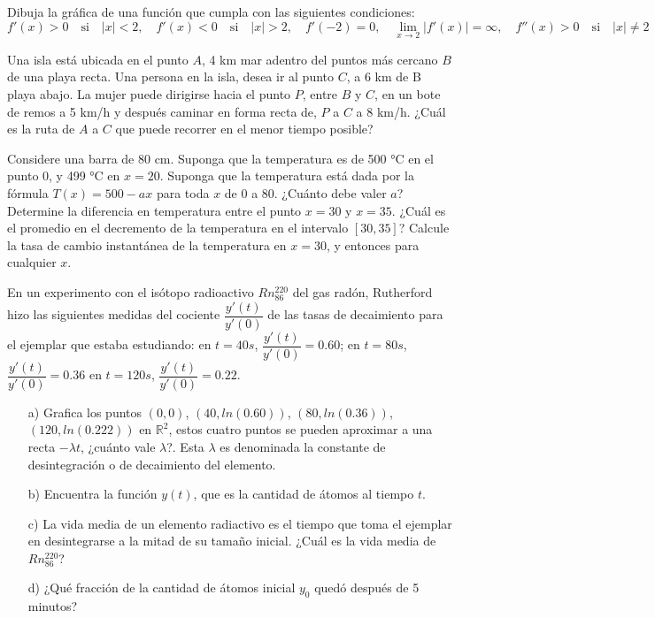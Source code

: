 \documentclass[10pt]{exam}
\begin{document}
\begin{questions}
\question Dibuja la gráfica de una función que cumpla con las siguientes condiciones:
$$f'(x)>0 \quad \text{si}\quad |x|<2, \quad f'(x)<0 \quad \text{si}\quad |x|>2, \quad f'(-2)=0, \quad \lim\limits_{x \to 2}|f'(x)|=\infty, \quad f''(x)>0 \quad \text{si}\quad |x|\neq 2$$

\question Una isla está ubicada en el punto $A$, 4 km mar adentro del puntos más cercano $B$ de una playa recta. Una persona en la isla, desea ir al punto $C$, a 6 km de B playa abajo. La mujer puede dirigirse hacia el punto $P$, entre $B$ y $C$, en un bote de remos a 5 km/h y después caminar en forma recta de, $P$ a $C$ a 8 km/h. ¿Cuál es la ruta de $A$ a $C$ que puede recorrer en el menor tiempo posible?

\question Considere una barra de 80 cm. Suponga que la temperatura es de 500 °C en el punto 0, y 499 °C en $x = 20$. Suponga que la temperatura está dada por la fórmula $T(x) = 500-ax$ para toda $x$ de 0 a 80. ¿Cuánto debe valer $a$? Determine la diferencia en temperatura entre el punto $x = 30$ y $x = 35$. ¿Cuál es el promedio en el decremento de la temperatura en el intervalo $[30,35]$? Calcule la tasa de cambio instantánea de la temperatura en $x = 30$, y entonces para cualquier $x$.

\question En un experimento con el isótopo radioactivo $Rn^{220}_{86}$ del gas radón, Rutherford hizo las siguientes medidas del cociente $\dfrac{y'(t)}{y'(0)}$ de las tasas de decaimiento para el ejemplar que estaba estudiando: en $t = 40s$, $\dfrac{y'(t)}{y'(0)}=0.60$; en $t = 80s$, $\dfrac{y'(t)}{y'(0)}=0.36$ en $t = 120s$, $\dfrac{y'(t)}{y'(0)}=0.22$.
\begin{itemize}
    \item [a)] Grafica los puntos $(0,0)$, $(40, ln (0.60))$, $(80, ln( 0.36))$, $(120, ln (0.222))$ en $\mathbb{R}^{2}$, estos cuatro puntos se pueden aproximar a una recta $-\lambda t$, ¿cuánto vale $\lambda$?.
    Esta $\lambda$ es denominada la constante de desintegración o de decaimiento del elemento. 

    \item [b)] Encuentra la función $y(t)$, que es la cantidad de átomos al tiempo $t$.

    \item [c)] La vida media de un elemento radiactivo es el tiempo que toma el ejemplar en desintegrarse a la mitad de su tamaño inicial. ¿Cuál es la vida media de $Rn^{220}_{86}$?

    \item [d)] ¿Qué fracción de la cantidad de átomos inicial $y_0$ quedó después de 5 minutos?


\end{itemize}
\end{questions}
\end{document}
